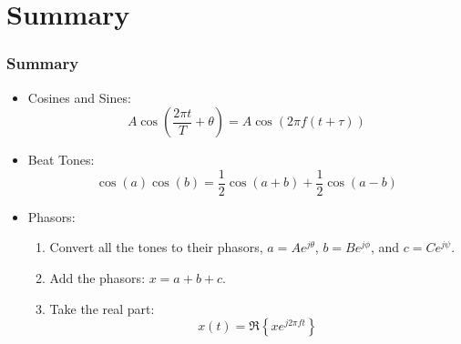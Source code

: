 \documentclass{beamer}
\begin{document}
\section[Summary]{Summary}
\setcounter{subsection}{1}

\begin{frame}
  \frametitle{Summary}
  \begin{itemize}
  \item Cosines and Sines:
    \[
    A\cos\left(\frac{2\pi t}{T}+\theta\right)=A\cos\left(2\pi f(t+\tau)\right)
    \]
  \item Beat Tones:
    \[
    \cos(a)\cos(b)=\frac{1}{2}\cos(a+b)+\frac{1}{2}\cos(a-b)
    \]
  \item Phasors:
    \begin{enumerate}
    \item Convert all the tones to their phasors, $a=Ae^{j\theta}$,
      $b=Be^{j\phi}$, and $c=Ce^{j\psi}$.
    \item Add the phasors: $x=a+b+c$.
    \item Take the real part:
      \[x(t) = \Re\left\{xe^{j2\pi ft}\right\}
      \]
    \end{enumerate}
  \end{itemize}
\end{frame}
\end{document}
